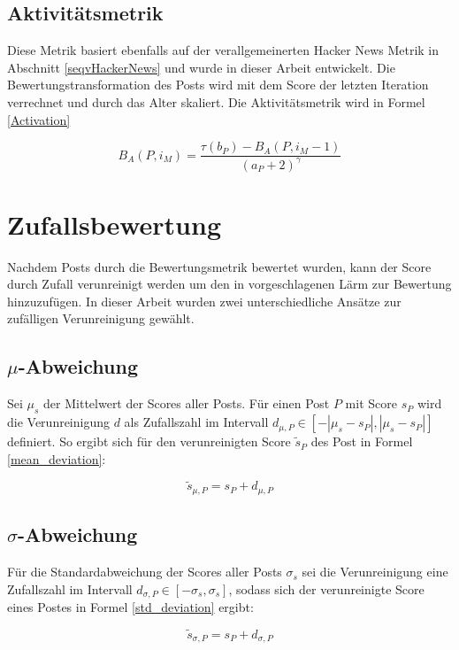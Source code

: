 \subsection{Aktivitätsmetrik}
Diese Metrik basiert ebenfalls auf der verallgemeinerten Hacker News Metrik in Abschnitt \ref{seqvHackerNews} und wurde in dieser Arbeit entwickelt.
Die Bewertungstransformation des Posts wird mit dem Score der letzten Iteration verrechnet und durch das Alter skaliert. Die Aktivitätsmetrik wird in Formel \ref{Activation}

\begin{equation}
\label{Activation}
B_A(P, i_M) = \frac{\tau(b_{P}) - B_A(P,i_M-1)}{(a_{P} + 2)^{\gamma}}
\end{equation}


\section{Zufallsbewertung}

Nachdem Posts durch die Bewertungsmetrik bewertet wurden, kann der Score durch Zufall verunreinigt werden um den in \cite{Luu} vorgeschlagenen Lärm zur Bewertung hinzuzufügen. In dieser Arbeit wurden zwei unterschiedliche Ansätze zur zufälligen Verunreinigung gewählt.

\subsection{$\mu$-Abweichung}

Sei $\mu_s$ der Mittelwert der Scores aller Posts. Für einen Post $P$ mit Score $s_P$ wird die Verunreinigung $d$ als Zufallszahl im Intervall $d_{\mu,P} \in [-|\mu_s - s_P|,|\mu_s - s_P|]$ definiert. So ergibt sich für den verunreinigten Score $\tilde{s}_P$ des Post in Formel \ref{mean_deviation}:

\begin{equation}
\label{mean_deviation}
\tilde{s}_{\mu,P} =  s_P + d_{\mu,P}
\end{equation} 

\subsection{$\sigma$-Abweichung}

Für die Standardabweichung der Scores aller Posts $\sigma_s$ sei die Verunreinigung eine Zufallszahl im Intervall $d_{\sigma,P} \in [-\sigma_s,\sigma_s]$, sodass sich der verunreinigte Score eines Postes in Formel \ref{std_deviation} ergibt:

\begin{equation}
\label{std_deviation}
\tilde{s}_{\sigma,P} = s_P + d_{\sigma,P}
\end{equation}

	